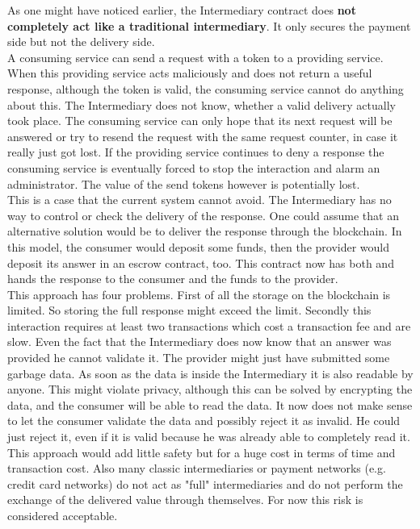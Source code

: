 \documentclass[a4paper,12pt]{scrartcl}
\begin{document}
As one might have noticed earlier, the Intermediary contract does \textbf{not completely act like a traditional intermediary}. It only secures the payment side but not the delivery side.\\
A consuming service can send a request with a token to a providing service. When this providing service acts maliciously and does not return a useful response, although the token is valid, the consuming service cannot do anything about this. The Intermediary does not know, whether a valid delivery actually took place. The consuming service can only hope that its next request will be answered or try to resend the request with the same request counter, in case it really just got lost. If the providing service continues to deny a response the consuming service is eventually forced to stop the interaction and alarm an administrator. The value of the send tokens however is potentially lost.\\
This is a case that the current system cannot avoid. The Intermediary has no way to control or check the delivery of the response. One could assume that an alternative solution would be to deliver the response through the blockchain. In this model, the consumer would deposit some funds, then the provider would deposit its answer in an escrow contract, too. This contract now has both and hands the response to the consumer and the funds to the provider.\\
This approach has four problems. First of all the storage on the blockchain is limited. So storing the full response might exceed the limit. Secondly this interaction requires at least two transactions which cost a transaction fee and are slow. Even the fact that the Intermediary does now know that an answer was provided he cannot validate it. The provider might just have submitted some garbage data. As soon as the data is inside the Intermediary it is also readable by anyone. This might violate privacy, although this can be solved by encrypting the data, and the consumer will be able to read the data. It now does not make sense to let the consumer validate the data and possibly reject it as invalid. He could just reject it, even if it is valid because he was already able to completely read it.\\
This approach would add little safety but for a huge cost in terms of time and transaction cost. Also many classic intermediaries or payment networks (e.g. credit card networks) do not act as "full" intermediaries and do not perform the exchange of the delivered value through themselves. For now this risk is considered acceptable.
\end{document}
